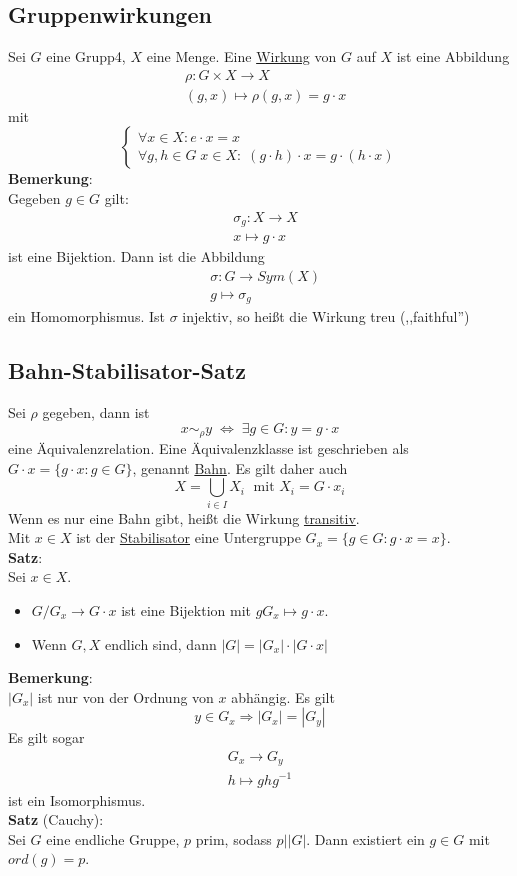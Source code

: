 \documentclass[a4paper, 12pt]{article}
\begin{document}
\subsection{Gruppenwirkungen}
Sei $G$ eine Grupp4, $X$ eine Menge. Eine \underline{Wirkung} von $G$ auf $X$ ist eine Abbildung \begin{eqnarray*}
	&\rho: G\times X \to X\\
	&(g,x) \mapsto \rho(g,x) = g\cdot x
\end{eqnarray*}
mit \[\begin{cases}
	\forall x \in X: e\cdot x = x\\
	\forall g,h \in G\; x\in X: \; (g\cdot h)\cdot x = g\cdot (h\cdot x)
\end{cases}\]
\textbf{Bemerkung}:\\
Gegeben $g \in G$ gilt: \begin{eqnarray*}
	&\sigma_g: X \to X\\
	&x \mapsto g\cdot x
\end{eqnarray*} ist eine Bijektion.
Dann ist die Abbildung \begin{eqnarray*}
	&\sigma: G \to Sym(X)\\
	&g \mapsto \sigma_g
\end{eqnarray*} ein Homomorphismus. Ist $\sigma$ injektiv, so heißt die Wirkung treu (,,faithful'')
\subsection{Bahn-Stabilisator-Satz}
Sei $\rho$ gegeben, dann ist \[x\sim_\rho y \;\Leftrightarrow \; \exists g \in G: y=g\cdot x\] eine Äquivalenzrelation. Eine Äquivalenzklasse ist geschrieben als $G\cdot x = \{g\cdot x: g \in G\}$, genannt \underline{Bahn}. Es gilt daher auch \[X = \bigcup_{i \in I} X_i \;\text{ mit } X_i = G\cdot x_i\] Wenn es nur eine Bahn gibt, heißt die Wirkung \underline{transitiv}.\\
Mit $x \in X$ ist der \underline{Stabilisator} eine Untergruppe $G_x = \{g \in G: g\cdot x = x\}$.\\
\textbf{Satz}:\\
Sei $x \in X$. \begin{itemize}
	\item $G/G_x \to G\cdot x$ ist eine Bijektion mit $gG_x \mapsto g\cdot x$.
	\item Wenn $G,X$ endlich sind, dann $\left|G\right| = \left|G_x\right|\cdot \left|G\cdot x\right|$
\end{itemize}
\textbf{Bemerkung}:\\
$\left|G_x\right|$ ist nur von der Ordnung von $x$ abhängig. Es gilt \[y \in G_x \Rightarrow \left|G_x\right| = \left|G_y\right|\]
Es gilt sogar \begin{eqnarray*}
	G_x \to G_y\\
	h \mapsto ghg^{-1}
\end{eqnarray*} ist ein Isomorphismus.\\
\textbf{Satz} (Cauchy):\\
Sei $G$ eine endliche Gruppe, $p$ prim, sodass $p | \left|G\right|$. Dann existiert ein $g \in G$ mit $ord(g) = p$.
\end{document}
